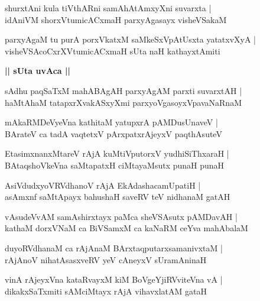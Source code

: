 \documentclass[twoside,12pt,openright]{book}
\newcounter{shloka}[chapter]
\def\uvaca#1{\centerline{{\large\textbf{#1}}}}
\begin{document}
\begin{shloka}
shurxtAni kula tiVthARni samAhAtAmxyXni suvarxta |\\
idAniVM shorxVtumicACxmaH parxyAgasayx visheVSakaM  
\end{shloka}

\begin{shloka}
parxyAgaM  tu purA porxVkatxM saMkeSxVpAtUsxta yatatxvXyA |\\
visheVSAcoCxrXVtumicACxmaH sUta naH kathayxtAmiti 
\end{shloka}

\uvaca{|| sUta uvAca ||}

\begin{shloka}
sAdhu paqSaTxM mahABAgAH  parxyAgAM parxti suvarxtAH |\\
haMtAhaM tatapxrXvakASxyXmi parxyoVgasoyxVpavaNaRnaM 
\end{shloka}

\begin{shloka}
mAkaRMDeVyeVna kathitaM yatupxrA pAMDusUnaveV |\\
BArateV ca tadA vaqtetxV pArxpatxrAjeyxV paqthAsuteV 
\end{shloka}

\begin{shloka}
EtasimxnanxMtareV rAjA kuMtiVputorxV yudhiSiThxaraH |\\
BAtaqshoVkeVna saMtapatxH ciMtayaMsutx punaH punaH 
\end{shloka}

\begin{shloka}
AsiVdudxyoVRVdhanoV rAjA EkAdashacamUpatiH |\\
asAmxnf saMtApayx bahushaH saveRV teV nidhanaM gatAH
\end{shloka}

\begin{shloka}
vAsudeVvAM samAshirxtayx paMca sheVSAsutx pAMDavAH |\\
kathaM dorxVNaM ca BiVSamxM ca kaNaRM ceYva mahAbalaM 
\end{shloka}

\begin{shloka}
duyoRVdhanaM ca rAjAnaM BArxtaqputarxsamanivxtaM |\\
rAjAnoV nihatAsasxveRV yeV cAneyxV sUramAninaH 
\end{shloka}

\begin{shloka}
vinA rAjeyxVna kataRvayxM kiM BoVgeYjiRVviteVna vA |\\
dikakxSaTxmiti sAMciMtayx rAjA vihavxlatAM gataH 
\end{shloka}
\end{document}
